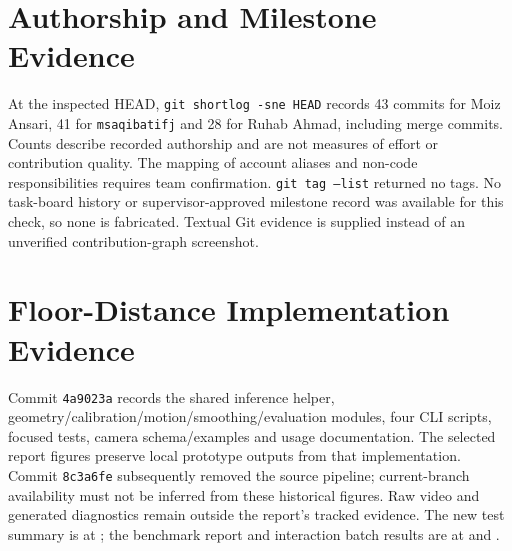 \section{Authorship and Milestone Evidence}
At the inspected HEAD, \texttt{git shortlog -sne HEAD} records 43 commits for Moiz Ansari, 41 for \texttt{msaqibatifj} and 28 for Ruhab Ahmad, including merge commits. Counts describe recorded authorship and are not measures of effort or contribution quality. The mapping of account aliases and non-code responsibilities requires team confirmation. \texttt{git tag --list} returned no tags. No task-board history or supervisor-approved milestone record was available for this check, so none is fabricated. Textual Git evidence is supplied instead of an unverified contribution-graph screenshot.

\section{Floor-Distance Implementation Evidence}
Commit \texttt{4a9023a} records the shared inference helper, geometry/calibration/motion/smoothing/evaluation modules, four CLI scripts, focused tests, camera schema/examples and usage documentation. The selected report figures preserve local prototype outputs from that implementation. Commit \texttt{8c3a6fe} subsequently removed the source pipeline; current-branch availability must not be inferred from these historical figures. Raw video and generated diagnostics remain outside the report's tracked evidence. The new test summary is at ; the benchmark report and interaction batch results are at  and .
